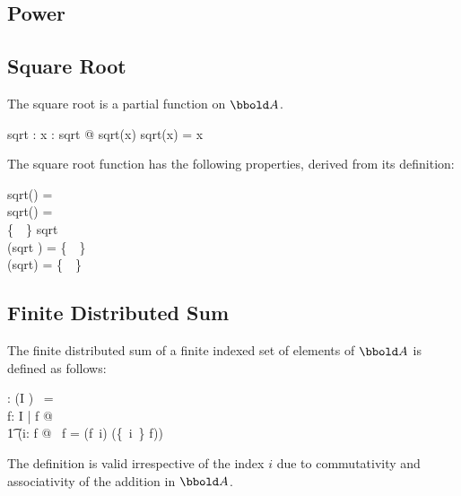 \documentclass[12pt]{article}
\begin{document}
\subsection{Power}
\label{sec:power}


\subsection{Square Root}
\label{sec:square-root}
The square root is a partial function on $\arithmos$.
\begin{axdef}
  sqrt : \arithmos \pfun \arithmos
  \where
  \forall x : \dom sqrt @ sqrt(x) \amult sqrt(x) = x
\end{axdef}

The square root function has the following properties, derived from
its definition:
\begin{zed}
  sqrt(\azero) = \azero\\
  sqrt(\aone) = \aone\\
  \realplus \cup \{~\azero~\} \subseteq \dom sqrt\\
  \dom (sqrt \rres \real) = \realplus \cup \{~\azero~\}\\
  \ran (\real \dres sqrt) = \realplus \cup \{~\azero~\}\\
\end{zed}

\subsection{Finite Distributed Sum}
\label{sec:fin-distr-sum}
The finite distributed sum of a finite indexed set of elements of
$\arithmos$ is defined as follows:

\begin{gendef}[I]
    \findistsum : (I \ffun \arithmos) \fun \arithmos
    \where
    \findistsum~\emptyset = \azero \\
    \forall f: I \ffun \arithmos | f \neq \emptyset @ \\
    \t1 (\exists i: \dom f @ \findistsum~f = (f~i) \aplus
    \findistsum(\{~i~\} \ndres f))
\end{gendef}
The definition is valid irrespective of the index $i$ due to
commutativity and associativity of the addition in $\arithmos$. 
\end{document}
